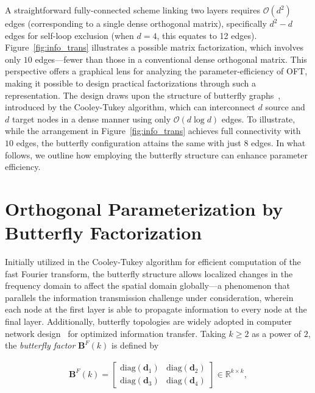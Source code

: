 A straightforward fully-connected scheme linking two layers requires $\mathcal{O}(d^2)$ edges (corresponding to a single dense orthogonal matrix), specifically $d^2-d$ edges for self-loop exclusion (when $d=4$, this equates to 12 edges). Figure~\ref{fig:info_trans} illustrates a possible matrix factorization, which involves only $10$ edges—fewer than those in a conventional dense orthogonal matrix. This perspective offers a graphical lens for analyzing the parameter-efficiency of OFT, making it possible to design practical factorizations through such a representation. The design draws upon the structure of butterfly graphs~\cite{cooley1965algorithm}, introduced by the Cooley-Tukey algorithm, which can interconnect $d$ source and $d$ target nodes in a dense manner using only $\mathcal{O}(d\log d)$ edges. To illustrate, while the arrangement in Figure~\ref{fig:info_trans} achieves full connectivity with $10$ edges, the butterfly configuration attains the same with just $8$ edges. In what follows, we outline how employing the butterfly structure can enhance parameter efficiency.

\section{Orthogonal Parameterization by Butterfly Factorization}

Initially utilized in the Cooley-Tukey algorithm for efficient computation of the fast Fourier transform, the butterfly structure allows localized changes in the frequency domain to affect the spatial domain globally—a phenomenon that parallels the information transmission challenge under consideration, wherein each node at the first layer is able to propagate information to every node at the final layer. Additionally, butterfly topologies are widely adopted in computer network design~\cite{solihin2015fundamentals,li2011linear} for optimized information transfer. Taking $k\geq 2$ as a power of $2$, the \emph{butterfly factor} $\bm{B}^F(k)$ is defined by

\begin{equation}\label{eq:but_factor}
\begin{aligned}
    \bm{B}^F(k)=\begin{bmatrix}
    \text{diag}(\bm{d}_1) & \text{diag}(\bm{d}_2) \\
    \text{diag}(\bm{d}_3) & \text{diag}(\bm{d}_4)
    \end{bmatrix}\in\mathbb{R}^{k\times k},
\end{aligned}
\end{equation}

